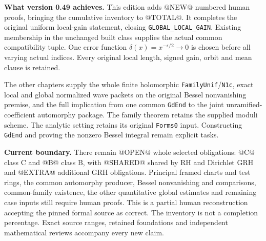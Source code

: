 \textbf{What version 0.49 achieves.}
This edition adds @NEW@ numbered human proofs, bringing the cumulative
inventory to @TOTAL@. It completes the original uniform local-gain
statement, closing \texttt{GLOBAL\_LOCAL\_GAIN}. Existing membership
in the unchanged built class supplies the actual common compatibility
tuple. One error function
\(\delta(x)=x^{-\epsilon/2}\to0\) is chosen before all varying
actual indices. Every original local length, signed gain, orbit and
mean clause is retained.

The other chapters supply the whole finite holomorphic
\texttt{FamilyUnif}/\texttt{N1c}, exact local and global normalized
wave packets on the original Bessel nonvanishing premise, and the
full implication from one common \texttt{GdEnd} to the joint
unramified-coefficient automorphy package. The family theorem retains
the supplied moduli scheme. The analytic setting retains its original
\texttt{Forms0} input. Constructing \texttt{GdEnd} and proving the
nonzero Bessel integral remain explicit tasks.

\textbf{Current boundary.}
There remain @OPEN@ whole selected obligations: @C@ class C and @B@
class B, with @SHARED@ shared by RH and Dirichlet GRH and @EXTRA@
additional GRH obligations. Principal framed charts and test rings,
the common automorphy producer, Bessel nonvanishing and comparisons,
common-family existence, the other quantitative global estimates
and remaining case inputs still require human proofs.
This is a partial human reconstruction accepting the pinned formal
source as correct. The inventory is not a completion percentage.
Exact source ranges, retained foundations and independent mathematical
reviews accompany every new claim.

